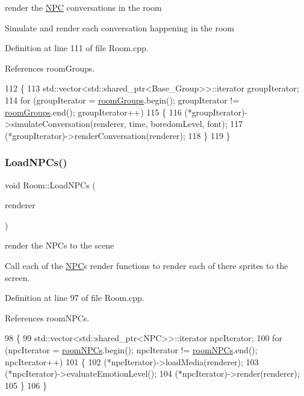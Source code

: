 render the \hyperlink{class_n_p_c}{N\+PC} conversations in the room 

Simulate and render each conversation happening in the room 

Definition at line 111 of file Room.\+cpp.



References room\+Groups.


\begin{DoxyCode}
112 \{
113     std::vector<std::shared\_ptr<Base\_Group>>::iterator groupIterator;
114     \textcolor{keywordflow}{for} (groupIterator = \hyperlink{class_room_a2d63fa17f30d50dd5267f04170a662b0}{roomGroups}.begin(); groupIterator != 
      \hyperlink{class_room_a2d63fa17f30d50dd5267f04170a662b0}{roomGroups}.end(); groupIterator++)
115     \{
116         (*groupIterator)->simulateConversation(renderer, time, boredomLevel, font);
117         (*groupIterator)->renderConversation(renderer);
118     \}
119 \}
\end{DoxyCode}
\mbox{\label{class_room_a876301b35488a7dc07bde00f0b701f9a}} 
\subsubsection{\texorpdfstring{Load\+N\+P\+Cs()}{LoadNPCs()}}
{\footnotesize\ttfamily void Room\+::\+Load\+N\+P\+Cs (\begin{DoxyParamCaption}\item[{S\+D\+L\+\_\+\+Renderer $\ast$}]{renderer }\end{DoxyParamCaption})}



render the N\+P\+Cs to the scene 

Call each of the \hyperlink{class_n_p_c}{N\+PC}\textquotesingle{}s render functions to render each of there sprites to the screen. 

Definition at line 97 of file Room.\+cpp.



References room\+N\+P\+Cs.


\begin{DoxyCode}
98 \{
99     std::vector<std::shared\_ptr<NPC>>::iterator npcIterator;
100     \textcolor{keywordflow}{for} (npcIterator = \hyperlink{class_room_a34bdf24cc8c52d638bcfd851c295f23b}{roomNPCs}.begin(); npcIterator != \hyperlink{class_room_a34bdf24cc8c52d638bcfd851c295f23b}{roomNPCs}.end(); npcIterator++)
101     \{
102         (*npcIterator)->loadMedia(renderer);
103         (*npcIterator)->evaluateEmotionLevel();
104         (*npcIterator)->render(renderer);
105     \}
106 \}
\end{DoxyCode}



